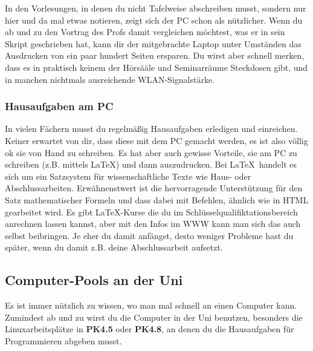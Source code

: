 			In den Vorlesungen, in denen du nicht Tafelweise abschreiben musst, sondern nur hier und da mal etwas notieren, zeigt sich der PC schon als nützlicher. Wenn du ab und zu den Vortrag des Profs damit vergleichen möchtest, was er in sein Skript geschrieben hat, kann dir der mitgebrachte Laptop unter Umständen das Ausdrucken von ein paar hundert Seiten ersparen. Du wirst aber schnell merken, dass es in praktisch keinem der Hörsääle und Seminarräume Steckdosen gibt, und in manchen nichtmals ausreichende WLAN-Signalstärke.

		\subsubsection{Hausaufgaben am PC}
			In vielen Fächern musst du regelmäßig
			Hausaufgaben erledigen und einreichen. Keiner
			erwartet von dir, dass diese mit dem PC gemacht
			werden, es ist also völlig ok sie von Hand zu
			schreiben. Es hat aber auch gewisse Vorteile,
			sie am PC zu schreiben (z.B. mittels \LaTeX) und
			dann auszudrucken. Bei \LaTeX\ handelt es sich
			um ein Satzsystem für wissenschaftliche
			Texte wie Haus- oder Abschlussarbeiten.
			Erwähnenstwert ist die hervorragende
			Unterstützung für den Satz mathematischer
			Formeln und dass dabei mit Befehlen, ähnlich wie
			in HTML gearbeitet wird. Es gibt \LaTeX-Kurse die du im Schlüsselqualifiktationsbereich anrechnen lassen kannst, aber mit den Infos im WWW kann man sich das auch selbst beibringen. Je eher du damit anfängst, desto weniger Probleme hast du später, wenn du damit z.B. deine Abschlussarbeit aufsetzt.

		\subsection{Computer-Pools an der Uni}
			Es ist immer nützlich zu wissen, wo man mal schnell an einen Computer kann. Zumindest ab und zu wirst du die Computer in der Uni benutzen, besonders die Linuxarbeitsplätze in \textbf{PK4.5} oder \textbf{PK4.8}, an denen du die Hausaufgaben für Programmieren abgeben musst.

